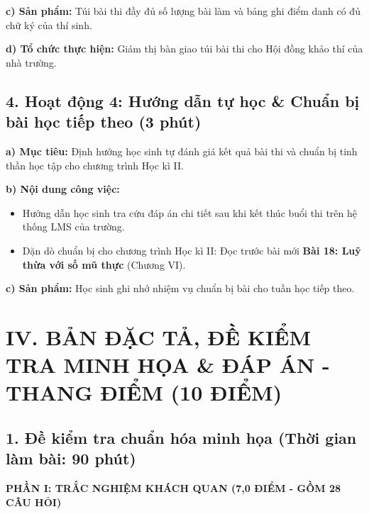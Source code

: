 \documentclass[12pt, a4paper]{article}
\begin{document}
\noindent \textbf{c) Sản phẩm:}
Túi bài thi đầy đủ số lượng bài làm và bảng ghi điểm danh có đủ chữ ký của thí sinh.

\noindent \textbf{d) Tổ chức thực hiện:}
Giám thị bàn giao túi bài thi cho Hội đồng khảo thí của nhà trường.

\subsection*{4. Hoạt động 4: Hướng dẫn tự học \& Chuẩn bị bài học tiếp theo (3 phút)}

\noindent \textbf{a) Mục tiêu:}
Định hướng học sinh tự đánh giá kết quả bài thi và chuẩn bị tinh thần học tập cho chương trình Học kì II.

\noindent \textbf{b) Nội dung công việc:}
\begin{itemize}
    \item Hướng dẫn học sinh tra cứu đáp án chi tiết sau khi kết thúc buổi thi trên hệ thống LMS của trường.
    \item Dặn dò chuẩn bị cho chương trình Học kì II: Đọc trước bài mới \textbf{Bài 18: Luỹ thừa với số mũ thực} (Chương VI).
\end{itemize}

\noindent \textbf{c) Sản phẩm:}
Học sinh ghi nhớ nhiệm vụ chuẩn bị bài cho tuần học tiếp theo.

\vspace{5pt}

\section*{IV. BẢN ĐẶC TẢ, ĐỀ KIỂM TRA MINH HỌA \& ĐÁP ÁN - THANG ĐIỂM (10 ĐIỂM)}

\subsection*{1. Đề kiểm tra chuẩn hóa minh họa (Thời gian làm bài: 90 phút)}

\begin{center}
    \textbf{PHẦN I: TRẮC NGHIỆM KHÁCH QUAN (7,0 ĐIỂM - GỒM 28 CÂU HỎI)}
\end{center}
\end{document}
